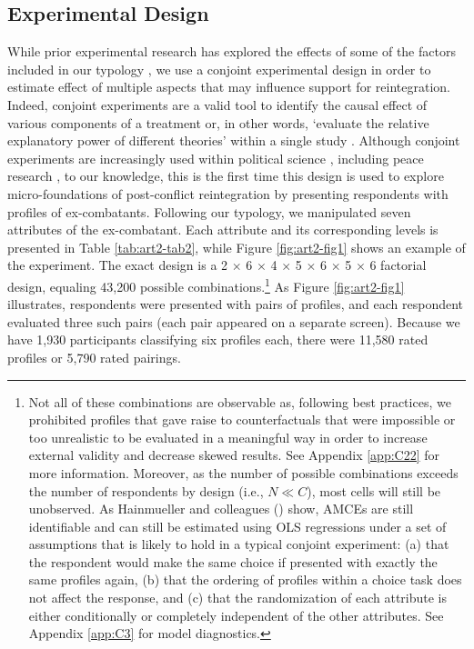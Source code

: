 \subsection{Experimental Design}

While prior experimental research has explored the effects of some of the factors included in our typology \citep[e.g.,][]{Clubb2019}, we use a conjoint experimental design in order to estimate effect of multiple aspects that may influence support for reintegration. Indeed, conjoint experiments are a valid tool to identify the causal effect of various components of a treatment or, in other words, `evaluate the relative explanatory power of different theories' within a single study \citep[][p. 3]{Hainmueller2014a}. Although conjoint experiments are increasingly used within political science \citep[e.g.,][]{Huff2018, Johns2019}, including peace research \citep[e.g.,][]{Tellez2019a, Gutierrez-Romero2020}, to our knowledge, this is the first time this design is used to explore micro-foundations of post-conflict reintegration by presenting respondents with profiles of ex-combatants. Following our typology, we manipulated seven attributes of the ex-combatant. Each attribute and its corresponding levels is presented in Table \ref{tab:art2-tab2}, while Figure \ref{fig:art2-fig1} shows an example of the experiment. The exact design is a 2 $\mathrm{\times}$ 6 $\mathrm{\times}$ 4 $\mathrm{\times}$ 5 $\mathrm{\times}$ 6 $\mathrm{\times}$ 5 $\mathrm{\times}$ 6 factorial design, equaling 43,200 possible combinations.\footnote{ Not all of these combinations are observable as, following best practices, we prohibited profiles that gave raise to counterfactuals that were impossible or too unrealistic to be evaluated in a meaningful way in order to increase external validity and decrease skewed results. See Appendix \ref{app:C22} for more information. Moreover, as the number of possible combinations exceeds the number of respondents by design (i.e., $N \ll C$), most cells will still be unobserved. As Hainmueller and colleagues (\citeyear{Hainmueller2014a}) show, AMCEs are still identifiable and can still be estimated using OLS regressions under a set of assumptions that is likely to hold in a typical conjoint experiment: (a) that the respondent would make the same choice if presented with exactly the same profiles again, (b) that the ordering of profiles within a choice task does not affect the response, and (c) that the randomization of each attribute is either conditionally or completely independent of the other attributes. See Appendix \ref{app:C3} for model diagnostics.} As Figure \ref{fig:art2-fig1} illustrates, respondents were presented with pairs of profiles, and each respondent evaluated three such pairs (each pair appeared on a separate screen). Because we have 1,930 participants classifying six profiles each, there were 11,580 rated profiles or 5,790 rated pairings.

